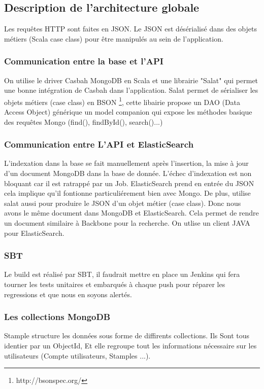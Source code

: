 \documentclass[11pt]{article} %
\begin{document}
\subsection{Description de l'architecture globale}
Les requêtes HTTP sont faites en JSON.
Le JSON est désérialisé dans des objets métiers 
(Scala case class) pour être manipulés au sein de l'application.
\subsubsection{Communication entre la base et l'API}
On utilise le driver Casbah MongoDB en Scala et une librairie "Salat" qui permet une bonne intégration de Casbah dans l'application.
Salat permet de sérialiser les objets métiers (case class) en BSON \footnote{http://bsonspec.org/}, cette libairie propose un DAO (Data Access Object) générique un model companion qui expose les méthodes basique des requêtes Mongo (find(), findById(), search()...)
\subsubsection{Communication entre L'API et ElasticSearch}
L'indexation dans la base se fait manuellement après l'insertion, la mise à jour d'un document MongoDB dans la base de donnée.
L'échec d'indexation est non bloquant car il est ratrappé par un Job.
ElasticSearch prend en entrée du JSON cela implique qu'il fontionne particuliérement bien avec Mongo.
De plus, utilise salat aussi pour produire le JSON d'un objet métier (case class).
Donc nous avons le même document dans MongoDB et ElasticSearch. Cela permet de rendre un document similaire à Backbone pour la recherche.
On utlise un client JAVA pour ElasticSearch.
\subsubsection{SBT}
Le build est réalisé par SBT, il faudrait mettre en place un Jenkins qui fera tourner les tests unitaires et embarqués à chaque push pour réparer les regressions et que nous en soyons alertés.
\subsubsection{Les collections MongoDB}
Stample structure les données sous forme de diffirents collections.
Ils Sont tous identier par un ObjectId, Et elle regroupe tout les informations nécessaire sur les utilisateurs (Compte utilisateurs, Stamples ...).
\end{document}
